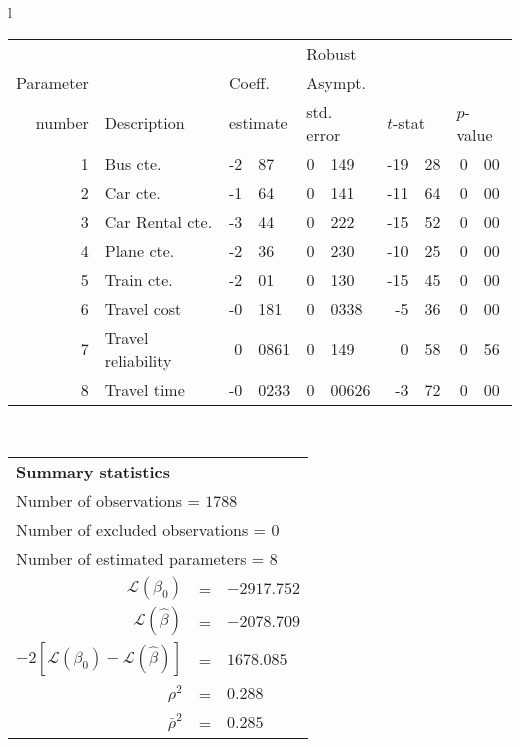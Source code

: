   \begin{tabular}{l}
\begin{tabular}{rlr@{.}lr@{.}lr@{.}lr@{.}l}
         &                       &   \multicolumn{2}{l}{}    & \multicolumn{2}{l}{Robust}  &     \multicolumn{4}{l}{}   \\
Parameter &                       &   \multicolumn{2}{l}{Coeff.}      & \multicolumn{2}{l}{Asympt.}  &     \multicolumn{4}{l}{}   \\
number &  Description                     &   \multicolumn{2}{l}{estimate}      & \multicolumn{2}{l}{std. error}  &   \multicolumn{2}{l}{$t$-stat}  &   \multicolumn{2}{l}{$p$-value}   \\

\hline

1 & Bus cte. & -2&87 & 0&149 & -19&28 & 0&00\\
2 & Car cte. & -1&64 & 0&141 & -11&64 & 0&00\\
3 & Car Rental cte. & -3&44 & 0&222 & -15&52 & 0&00\\
4 & Plane cte. & -2&36 & 0&230 & -10&25 & 0&00\\
5 & Train cte. & -2&01 & 0&130 & -15&45 & 0&00\\
6 & Travel cost & -0&181 & 0&0338 & -5&36 & 0&00\\
7 & Travel reliability & 0&0861 & 0&149 & 0&58 & 0&56\\
8 & Travel time & -0&0233 & 0&00626 & -3&72 & 0&00\\
\hline
\end{tabular}
\\
\begin{tabular}{rcl}
\multicolumn{3}{l}{\bf Summary statistics}\\
\multicolumn{3}{l}{ Number of observations = $1788$} \\
\multicolumn{3}{l}{ Number of excluded observations = $0$} \\
\multicolumn{3}{l}{ Number of estimated  parameters = $8$} \\
 $\mathcal{L}(\beta_0)$ &=&  $-2917.752$ \\
 $\mathcal{L}(\hat{\beta})$ &=& $-2078.709 $  \\
 $-2[\mathcal{L}(\beta_0) -\mathcal{L}(\hat{\beta})]$ &=& $1678.085$ \\
    $\rho^2$ &=&   $0.288$ \\
    $\bar{\rho}^2$ &=&    $0.285$ \\
\end{tabular}
  \end{tabular}

